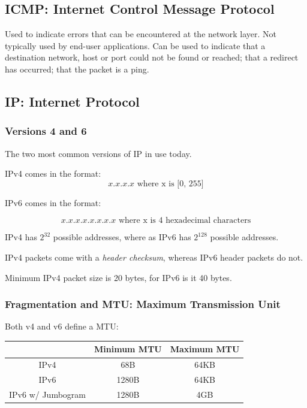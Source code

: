 \documentclass{article}
\begin{document}
\subsection{ICMP: Internet Control Message Protocol}

Used to indicate errors that can be encountered at the network layer. Not typically used by end-user applications. Can be used to indicate that a destination network, host or port could not be found or reached; that a redirect has occurred; that the packet is a ping.

\subsection{IP: Internet Protocol}

\subsubsection{Versions 4 and 6}

The two most common versions of IP in use today.

IPv4 comes in the format:
\[ x.x.x.x \text{ where x is [0, 255]}\]

IPv6 comes in the format:

\[ x.x.x.x.x.x.x.x \text{ where x is 4 hexadecimal characters} \]

IPv4 has $2^{32}$ possible addresses, where as IPv6 has $2^{128}$ possible addresses.

IPv4 packets come with a \textit{header checksum}, whereas IPv6 header packets do not.

Minimum IPv4 packet size is 20 bytes, for IPv6 is it 40 bytes.

\subsubsection{Fragmentation and MTU: Maximum Transmission Unit}

Both v4 and v6 define a MTU:

\begin{center}
  \begin{tabular}{|c|c|c|}
    \hline
    & Minimum MTU & Maximum MTU\\
    \hline\hline
    IPv4 & 68B & 64KB\\
    \hline
    IPv6 & 1280B & 64KB\\
    \hline
    IPv6 w/ Jumbogram & 1280B & 4GB\\
    \hline
  \end{tabular}
\end{center}
\end{document}
